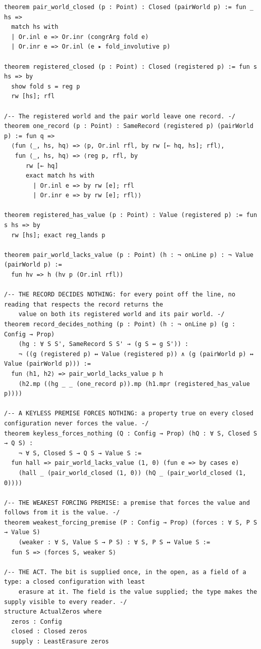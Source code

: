 \documentclass[10pt,twocolumn]{article}
\begin{document}
\begin{Verbatim}
theorem pair_world_closed (p : Point) : Closed (pairWorld p) := fun _ hs =>
  match hs with
  | Or.inl e => Or.inr (congrArg fold e)
  | Or.inr e => Or.inl (e ▸ fold_involutive p)

theorem registered_closed (p : Point) : Closed (registered p) := fun s hs => by
  show fold s = reg p
  rw [hs]; rfl

/-- The registered world and the pair world leave one record. -/
theorem one_record (p : Point) : SameRecord (registered p) (pairWorld p) := fun q =>
  ⟨fun ⟨_, hs, hq⟩ => ⟨p, Or.inl rfl, by rw [← hq, hs]; rfl⟩,
   fun ⟨_, hs, hq⟩ => ⟨reg p, rfl, by
      rw [← hq]
      exact match hs with
        | Or.inl e => by rw [e]; rfl
        | Or.inr e => by rw [e]; rfl⟩⟩

theorem registered_has_value (p : Point) : Value (registered p) := fun s hs => by
  rw [hs]; exact reg_lands p

theorem pair_world_lacks_value (p : Point) (h : ¬ onLine p) : ¬ Value (pairWorld p) :=
  fun hv => h (hv p (Or.inl rfl))

/-- THE RECORD DECIDES NOTHING: for every point off the line, no reading that respects the record returns the
    value on both its registered world and its pair world. -/
theorem record_decides_nothing (p : Point) (h : ¬ onLine p) (g : Config → Prop)
    (hg : ∀ S S', SameRecord S S' → (g S ↔ g S')) :
    ¬ ((g (registered p) ↔ Value (registered p)) ∧ (g (pairWorld p) ↔ Value (pairWorld p))) :=
  fun ⟨h1, h2⟩ => pair_world_lacks_value p h
    (h2.mp ((hg _ _ (one_record p)).mp (h1.mpr (registered_has_value p))))

/-- A KEYLESS PREMISE FORCES NOTHING: a property true on every closed configuration never forces the value. -/
theorem keyless_forces_nothing (Q : Config → Prop) (hQ : ∀ S, Closed S → Q S) :
    ¬ ∀ S, Closed S → Q S → Value S :=
  fun hall => pair_world_lacks_value (1, 0) (fun e => by cases e)
    (hall _ (pair_world_closed (1, 0)) (hQ _ (pair_world_closed (1, 0))))

/-- THE WEAKEST FORCING PREMISE: a premise that forces the value and follows from it is the value. -/
theorem weakest_forcing_premise (P : Config → Prop) (forces : ∀ S, P S → Value S)
    (weaker : ∀ S, Value S → P S) : ∀ S, P S ↔ Value S :=
  fun S => ⟨forces S, weaker S⟩

/-- THE ACT. The bit is supplied once, in the open, as a field of a type: a closed configuration with least
    erasure at it. The field is the value supplied; the type makes the supply visible to every reader. -/
structure ActualZeros where
  zeros : Config
  closed : Closed zeros
  supply : LeastErasure zeros


\end{Verbatim}
\end{document}
